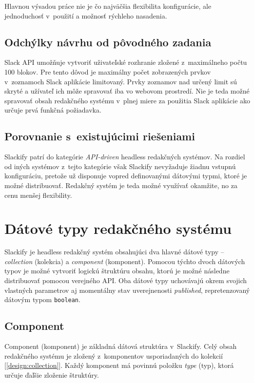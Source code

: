 \noindent Hlavnou výsadou práce nie je čo najväčšia flexibilita konfigurácie, ale jednoduchosť v~použití a možnosť rýchleho nasadenia. 

\subsection{Odchýlky návrhu od pôvodného zadania}
Slack API umožňuje vytvoriť uživateľské rozhranie zložené z~maximálneho počtu 100 blokov. Pre tento dôvod je maximálny počet zobrazených prvkov v~zoznamoch Slack aplikácie limitovaný. Prvky zoznamov nad určený limit sú skryté a užívateľ ich môže spravovať iba vo webovom prostredí. Nie je teda možné spravovať obsah redakčného systému v~plnej miere za použitia Slack aplikácie ako určuje prvá funkčná požiadavka.

\subsection{Porovnanie s~existujúcimi riešeniami}
Slackify patrí do kategórie \emph{API-driven} headless redakčných systémov. Na rozdiel od iných systémov z~tejto kategórie však Slackify nevyžaduje žiadnu vstupnú konfiguráciu, pretože už disponuje vopred definovanými dátovými typmi, ktoré je možné distribuovať. Redakčný systém je teda možné využívať okamžite, no za cenu menšej flexibility.

\section{Dátové typy redakčného systému}
\label{theory:data_types}
Slackify je headless redakčný systém obsahujúci dva hlavné dátové typy -- \emph{collection} (kolekcia) a \emph{component} (komponent). Pomocou týchto dvoch dátových typov je možné vytvoriť logickú štruktúru obsahu, ktorú je možné následne distribuovať pomocou verejného API. Oba dátové typy uchovávajú okrem svojich vlastných parametrov aj momentálny stav uverejnenosti \emph{published}, repretenzovaný dátovým typom \texttt{boolean}.

\subsection{Component}
Component (komponent) je základná dátová struktúra v~Slackify. Celý obsah redakčného systému je zložený z~komponentov usporiadaných do kolekcií [\ref{design:collection}]. Každý komponent má povinnú položku \emph{type} (typ), ktorá určuje ďaľšie zloženie štruktúry.

